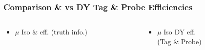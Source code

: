 \documentclass{beamer}
\begin{document}
\begin{frame}
 \frametitle{Comparison \ttbar \& \wpj vs DY Tag \& Probe Efficiencies}
   \begin{columns}

   \begin{column}{0.33\textwidth}
     \begin{itemize}
   \item $\mu$ Iso \ttbar \& \wpj eff. (truth info.)
  \end{itemize}
   \end{column}
   \begin{column}{0.33\textwidth}
   \begin{itemize}
    \item $\mu$ Iso DY eff. \\(Tag \& Probe)
   \end{itemize}


\end{column}
\end{columns}
\end{frame}
\end{document}
